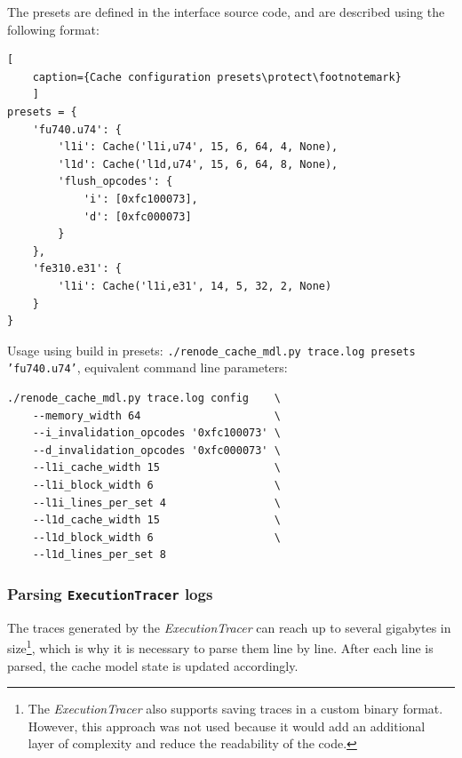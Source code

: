 \noindent The presets are defined in the interface source code, and are described using the following format:
\begin{center}
\centering
\begin{minipage}{\linewidth}
\begin{lstlisting}[
    caption={Cache configuration presets\protect\footnotemark}
    ]
presets = {
    'fu740.u74': {
        'l1i': Cache('l1i,u74', 15, 6, 64, 4, None),
        'l1d': Cache('l1d,u74', 15, 6, 64, 8, None),
        'flush_opcodes': {
            'i': [0xfc100073],
            'd': [0xfc000073]
        }
    },
    'fe310.e31': {
        'l1i': Cache('l1i,e31', 14, 5, 32, 2, None)
    }
}
\end{lstlisting}
\end{minipage}
\end{center}

\noindent Usage using build in presets: \texttt{./renode\_cache\_mdl.py trace.log presets 'fu740.u74'}, equivalent command line parameters:

\begin{verbatim}
./renode_cache_mdl.py trace.log config    \
    --memory_width 64                     \
    --i_invalidation_opcodes '0xfc100073' \
    --d_invalidation_opcodes '0xfc000073' \
    --l1i_cache_width 15                  \
    --l1i_block_width 6                   \
    --l1i_lines_per_set 4                 \
    --l1d_cache_width 15                  \
    --l1d_block_width 6                   \
    --l1d_lines_per_set 8
\end{verbatim}

\subsubsection*{Parsing \texttt{ExecutionTracer} logs}

The traces generated by the \textit{ExecutionTracer} can reach up to several gigabytes in size\footnote{The \textit{ExecutionTracer} also supports saving traces in a custom binary format. However,
this approach was not used because it would add an additional layer of complexity and reduce the readability of the code.}, which is why it is necessary to parse them line by line. 
After each line is parsed, the cache model state is updated accordingly.

